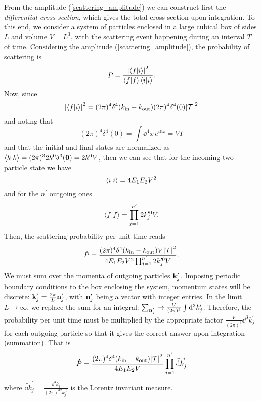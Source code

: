 From the amplitude (\ref{scattering_amplitude}) we can construct first the \textit{differential cross-section}, which gives the total cross-section upon integration. To this end, we consider a system of particles enclosed in a large cubical box of sides $L$ and volume $V=L^3$, with the scattering event happening during an interval $T$ of time. Considering the amplitude (\ref{scattering_amplitude}), the probability of scattering is
\begin{equation}
    P=\frac{\abs{\braket{f}{i}}^2}{\braket{f}\braket{i}}.
\end{equation}
Now, since
\begin{equation}
    \abs{\braket{f}{i}}^2=(2\pi)^4\delta^4(k_{\text{in}}-k_{\text{out}})(2\pi)^4\delta^4(0)\abs{\mathcal{T}}^2
\end{equation}
and noting that
\begin{equation}
    (2\pi)^4\delta^4(0)=\int\dd^4x\, e^{i0x}=VT
\end{equation}
and that the initial and final states are normalized as $\braket{k}=(2\pi)^32k^0\delta^3(\vb{0})=2k^0V$, then we can see that for the incoming two-particle state we have
\begin{equation}
    \braket{i}=4E_1E_2V^2
\end{equation}
and for the $n^\prime$ outgoing ones 
\begin{equation}
    \braket{f}=\prod_{j=1}^{n^\prime}2k^{\prime0}_{j} V.
\end{equation}
Then, the scattering probability per unit time reads
\begin{equation}
    \dot{P}=\frac{(2\pi)^4\delta^4(k_{\text{in}}-k_{\text{out}})V\abs{\mathcal{T}}^2}{4E_1E_2V^2\prod_{j=1}^{n^\prime}2k_j^{\prime0}V}.
\end{equation}
We must sum over the momenta of outgoing particles $\vb{k}^\prime_j$. Imposing periodic boundary conditions to the box enclosing the system, momentum states will be discrete: $\vb{k}^\prime_j=\frac{2\pi}{L}\vb{n}_j^\prime$, with $\vb{n}_j^\prime$ being a vector with integer entries. In the limit $L\to\infty$, we replace the sum for an integral: $\sum_{\vb{n}_j^\prime}\to\frac{V}{(2\pi)^3}\int\dd^3k^\prime_j$. Therefore, the probability per unit time must be multiplied by the appropriate factor $\frac{V}{(2\pi)^3}\dd^3k^\prime_j$ for each outgoing particle so that it gives the correct answer upon integration (summation). That is
\begin{equation}
    \dot{P}=\frac{(2\pi)^4\delta^4(k_{\text{in}}-k_{\text{out}})\abs{\mathcal{T}}^2}{4E_1E_2V}\prod_{j=1}^{n^\prime}\widetilde{\dd k}^\prime_j
\end{equation}
where $\widetilde{\dd k}_j^\prime=\frac{\dd^3 k_{j}^\prime}{(2\pi)^32k^{\prime0}_j}$ is the Lorentz invariant measure. \\

